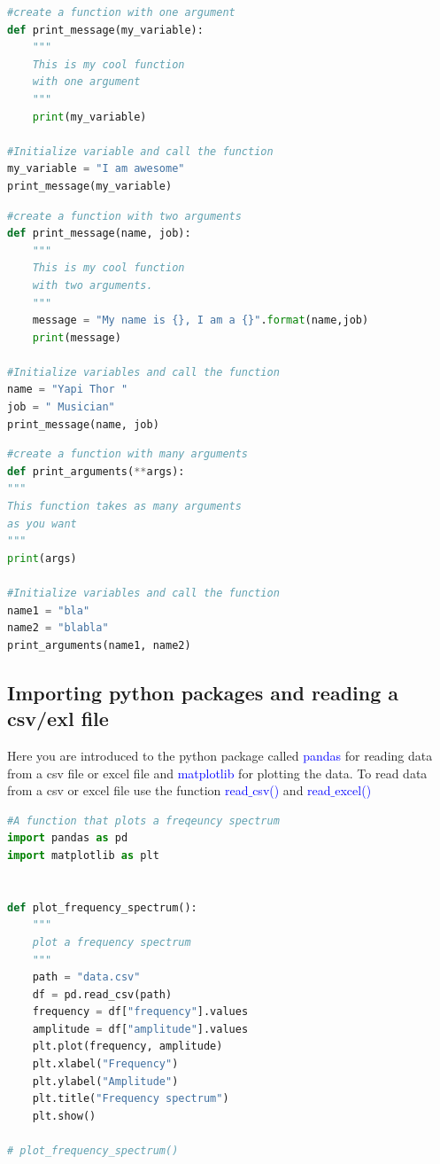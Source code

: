 \documentclass[10pt,a4paper,titlepage]{article}
\begin{document}
\begin{lstlisting}[language=python]
#create a function with one argument 
def print_message(my_variable):
	"""
	This is my cool function
	with one argument
	"""
	print(my_variable)

#Initialize variable and call the function
my_variable = "I am awesome"
print_message(my_variable)
\end{lstlisting}
\justify
\begin{lstlisting}[language=python]
#create a function with two arguments
def print_message(name, job):
	"""
	This is my cool function
	with two arguments.
	"""
	message = "My name is {}, I am a {}".format(name,job)
	print(message)

#Initialize variables and call the function
name = "Yapi Thor "
job = " Musician"
print_message(name, job)
\end{lstlisting}

\begin{lstlisting}[language=python]
#create a function with many arguments
def print_arguments(**args):
"""
This function takes as many arguments
as you want 
"""
print(args)

#Initialize variables and call the function
name1 = "bla"
name2 = "blabla"
print_arguments(name1, name2)
\end{lstlisting}


\subsection{Importing python packages and reading a csv/exl file}
Here you are introduced to the python package called \textcolor{blue}{pandas} for reading data from a csv file or excel file and \textcolor{blue}{matplotlib} for plotting the data. To read data from a csv or excel file use the function \textcolor{blue}{read$\_$csv()} and \textcolor{blue}{read$\_$excel()}
\begin{lstlisting}[language=python]
#A function that plots a freqeuncy spectrum
import pandas as pd
import matplotlib as plt


def plot_frequency_spectrum():
	"""
	plot a frequency spectrum
	"""
	path = "data.csv"
	df = pd.read_csv(path)
	frequency = df["frequency"].values
	amplitude = df["amplitude"].values
	plt.plot(frequency, amplitude)
	plt.xlabel("Frequency")
	plt.ylabel("Amplitude")
	plt.title("Frequency spectrum")
	plt.show()
	
# plot_frequency_spectrum()
\end{lstlisting}
\end{document}
